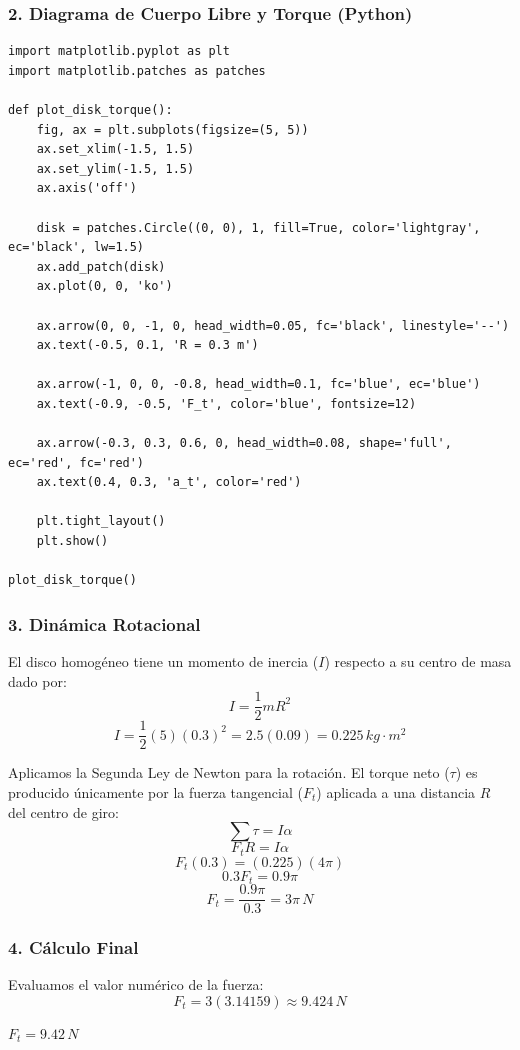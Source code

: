 \documentclass[12pt, a4paper]{article}
\begin{document}
\subsubsection*{2. Diagrama de Cuerpo Libre y Torque (Python)}
\begin{lstlisting}
import matplotlib.pyplot as plt
import matplotlib.patches as patches

def plot_disk_torque():
    fig, ax = plt.subplots(figsize=(5, 5))
    ax.set_xlim(-1.5, 1.5)
    ax.set_ylim(-1.5, 1.5)
    ax.axis('off')
    
    disk = patches.Circle((0, 0), 1, fill=True, color='lightgray', ec='black', lw=1.5)
    ax.add_patch(disk)
    ax.plot(0, 0, 'ko')
    
    ax.arrow(0, 0, -1, 0, head_width=0.05, fc='black', linestyle='--')
    ax.text(-0.5, 0.1, 'R = 0.3 m')
    
    ax.arrow(-1, 0, 0, -0.8, head_width=0.1, fc='blue', ec='blue')
    ax.text(-0.9, -0.5, 'F_t', color='blue', fontsize=12)
    
    ax.arrow(-0.3, 0.3, 0.6, 0, head_width=0.08, shape='full', ec='red', fc='red')
    ax.text(0.4, 0.3, 'a_t', color='red')

    plt.tight_layout()
    plt.show()

plot_disk_torque()
\end{lstlisting}

\subsubsection*{3. Dinámica Rotacional}
El disco homogéneo tiene un momento de inercia ($I$) respecto a su centro de masa dado por:
$$I = \frac{1}{2} m R^2$$
$$I = \frac{1}{2} (5) (0.3)^2 = 2.5 (0.09) = 0.225 \, \si{kg\cdot m^2}$$

Aplicamos la Segunda Ley de Newton para la rotación. El torque neto ($\tau$) es producido únicamente por la fuerza tangencial ($F_t$) aplicada a una distancia $R$ del centro de giro:
$$\sum \tau = I \alpha$$
$$F_t R = I \alpha$$
$$F_t (0.3) = (0.225)(4\pi)$$
$$0.3 F_t = 0.9\pi$$
$$F_t = \frac{0.9\pi}{0.3} = 3\pi \, \si{N}$$

\subsubsection*{4. Cálculo Final}
Evaluamos el valor numérico de la fuerza:
$$F_t = 3 (3.14159) \approx 9.424 \, \si{N}$$

\begin{tcolorbox}[colback=green!5!white, colframe=green!50!black, title=Respuesta Final]
\centering \Large $F_t = 9.42 \, \si{N}$
\end{tcolorbox}
\end{document}
